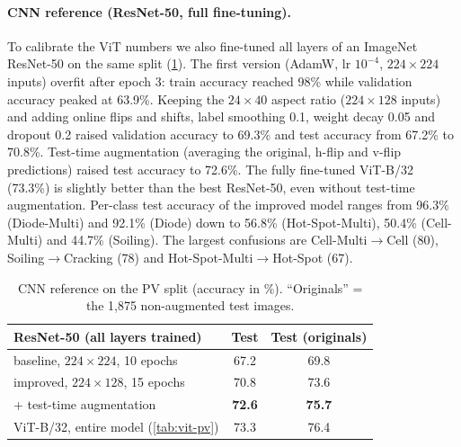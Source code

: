 \documentclass[10pt,twocolumn,letterpaper]{article}
\begin{document}

\paragraph{CNN reference (ResNet-50, full fine-tuning).}
To calibrate the ViT numbers we also fine-tuned all layers of an ImageNet ResNet-50 on the same split (\cref{tab:rn50}). The first version (AdamW, lr $10^{-4}$, $224{\times}224$ inputs) overfit after epoch 3: train accuracy reached 98\% while validation accuracy peaked at 63.9\%. Keeping the $24{\times}40$ aspect ratio ($224{\times}128$ inputs) and adding online flips and shifts, label smoothing 0.1, weight decay 0.05 and dropout 0.2 raised validation accuracy to 69.3\% and test accuracy from 67.2\% to 70.8\%. Test-time augmentation (averaging the original, h-flip and v-flip predictions) raised test accuracy to 72.6\%. The fully fine-tuned ViT-B/32 (73.3\%) is slightly better than the best ResNet-50, even without test-time augmentation. Per-class test accuracy of the improved model ranges from 96.3\% (Diode-Multi) and 92.1\% (Diode) down to 56.8\% (Hot-Spot-Multi), 50.4\% (Cell-Multi) and 44.7\% (Soiling). The largest confusions are Cell-Multi$\rightarrow$Cell (80), Soiling$\rightarrow$Cracking (78) and Hot-Spot-Multi$\rightarrow$Hot-Spot (67).

\begin{table}[t]
\centering\footnotesize\setlength{\tabcolsep}{3pt}
\begin{tabular}{@{}lcc@{}}
\toprule
ResNet-50 (all layers trained) & Test & Test (originals) \\
\midrule
baseline, $224{\times}224$, 10 epochs & 67.2 & 69.8 \\
improved, $224{\times}128$, 15 epochs & 70.8 & 73.6 \\
\quad + test-time augmentation & \textbf{72.6} & \textbf{75.7} \\
\midrule
ViT-B/32, entire model (\cref{tab:vit-pv}) & 73.3 & 76.4 \\
\bottomrule
\end{tabular}
\caption{CNN reference on the PV split (accuracy in \%). ``Originals'' = the 1{,}875 non-augmented test images.}
\label{tab:rn50}
\end{table}
\end{document}
